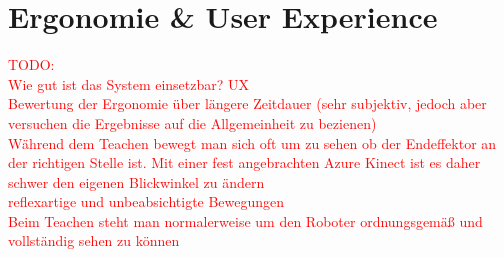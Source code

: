 \section{Ergonomie \& User Experience}


\textcolor{red}{TODO:\\
Wie gut ist das System einsetzbar? UX\\
Bewertung der Ergonomie über längere Zeitdauer (sehr subjektiv, jedoch aber versuchen die Ergebnisse auf die Allgemeinheit zu bezienen)\\
Während dem Teachen bewegt man sich oft um zu sehen ob der Endeffektor an der richtigen Stelle ist. Mit einer fest angebrachten Azure Kinect ist es daher schwer den eigenen Blickwinkel zu ändern\\
reflexartige und unbeabsichtigte Bewegungen\\
Beim Teachen steht man normalerweise um den Roboter ordnungsgemäß und vollständig sehen zu können
}


